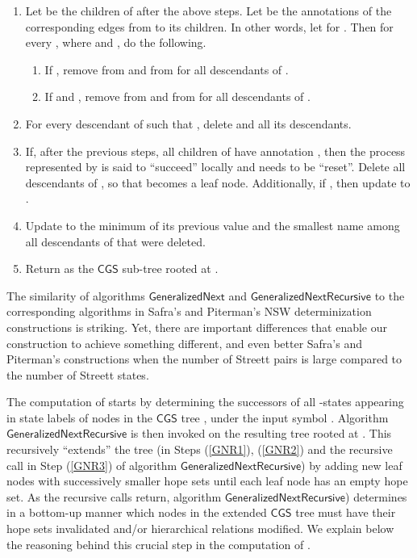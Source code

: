\documentclass[3p]{elsarticle}
\newcommand{\CGS}{\ensuremath{\textsf{CGS }}}
\newcommand{\algo}[1]{\ensuremath{\textsf{{#1}}}}
\begin{document}
{\begin{enumerate}
    
  \item \label{GNR4} Let  be the children of
     after the above steps. Let  be the
    annotations of the corresponding edges from  to its children.
    In other words, let  for . Then for every , where  and , do the following.
    
    \begin{enumerate}
    \item If , remove  from  and from
       for all descendants  of .
      
    \item If  and , remove  from
       and from  for all descendants 
      of .
      
    \end{enumerate}
    
  \item \label{GNR5} For every descendant  of  such that
    , delete  and all its descendants.


  \item \label{GNR6} If, after the previous steps, all children of 
    have annotation , then the process represented by  is
    said to ``succeed'' locally and needs to be ``reset''.  Delete all
    descendants of , so that  becomes a leaf node.
    Additionally, if , then update  to .
    
  \item \label{GNR7} Update  to the minimum of its previous value and
    the smallest name among all descendants of  that were deleted.

  \item \label{GNR8} Return  as the \CGS sub-tree rooted at .
    


  \end{enumerate}
}

The similarity of algorithms \algo{GeneralizedNext} and
\algo{GeneralizedNextRecursive} to the corresponding algorithms in
Safra's and Piterman's NSW determinization constructions is striking.
Yet, there are important differences that enable our construction to
achieve something different, and even better Safra's and Piterman's
constructions when the number of Streett pairs is large compared to
the number of Streett states.

The computation of  starts by determining the
successors of all -states appearing in state labels of nodes in the
\CGS tree , under the input symbol .  Algorithm
\algo{GeneralizedNextRecursive} is then invoked on the resulting tree
rooted at .  This recursively ``extends'' the tree (in
Steps (\ref{GNR1}), (\ref{GNR2}) and the recursive call in Step
(\ref{GNR3}) of algorithm \algo{GeneralizedNextRecursive}) by adding
new leaf nodes with successively smaller hope sets until each leaf
node has an empty hope set.  As the recursive calls return, algorithm
\algo{GeneralizedNextRecursive}) determines in a bottom-up manner
which nodes in the extended \CGS tree must have their hope sets
invalidated and/or hierarchical relations modified.  We explain below
the reasoning behind this crucial step in the computation of .
\end{document}
